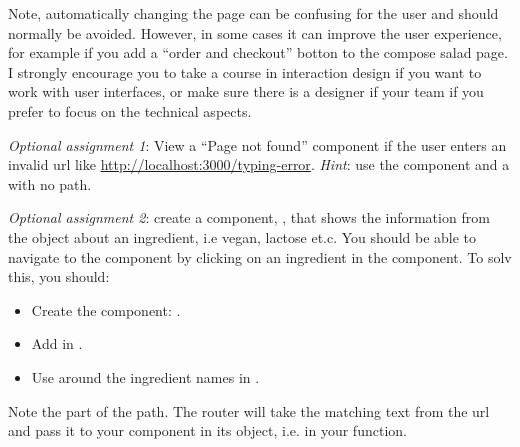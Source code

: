 \documentclass[fleqn, article, a4paper]{memoir}
\begin{document}
\begin{Assignments}
Note, automatically changing the page can be confusing for the user and should normally be avoided. However, in some cases it can improve the user experience, for example if you add a ``order and checkout'' botton to the compose salad page. I strongly encourage you to take a course in interaction design if you want to work with user interfaces, or make sure there is a designer if your team if you prefer to focus on the technical aspects.

\item \emph{Optional assignment 1}: View a ``Page not found'' component if the user enters an invalid url like \url{http://localhost:3000/typing-error}. \emph{Hint}: use the  component and a  with no path.

\item \emph{Optional assignment 2}: create a component, , that shows the information from the  object about an ingredient, i.e vegan, lactose et.c. You should be able to navigate to the  component by clicking on an ingredient in the  component. To solv this, you should:

\begin{itemize}
  \item Create the component: .
  \item Add  in .
  \item Use  around the ingredient names in .
\end{itemize}
Note the  part of the path. The router will take the matching text from the url and pass it to your component in its  object, i.e.  in your  function.


\end{Assignments}
\end{document}
